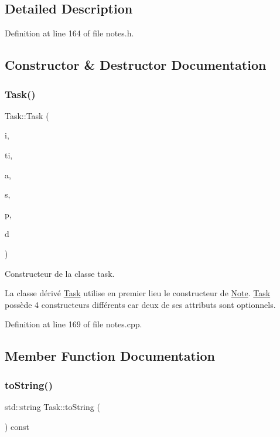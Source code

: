 \subsection{Detailed Description}


Definition at line 164 of file notes.\+h.



\subsection{Constructor \& Destructor Documentation}
\mbox{\label{class_task_a08a0f57803d8ef35f687f23f759e9f0c}} 
\subsubsection{\texorpdfstring{Task()}{Task()}}
{\footnotesize\ttfamily Task\+::\+Task (\begin{DoxyParamCaption}\item[{const Q\+String \&}]{i,  }\item[{const Q\+String \&}]{ti,  }\item[{const Q\+String \&}]{a,  }\item[{E\+N\+U\+M\+::\+Status\+Type}]{s,  }\item[{unsigned int}]{p,  }\item[{const Q\+Date\+Time}]{d }\end{DoxyParamCaption})}



Constructeur de la classe task. 

La classe dérivé \hyperlink{class_task}{Task} utilise en premier lieu le constructeur de \hyperlink{class_note}{Note}. \hyperlink{class_task}{Task} possède 4 constructeurs différents car deux de ses attributs sont optionnels. 

Definition at line 169 of file notes.\+cpp.



\subsection{Member Function Documentation}
\mbox{\label{class_task_a7fe5cb7b57a21693e7abfea2f9618563}} 
\subsubsection{\texorpdfstring{to\+String()}{toString()}}
{\footnotesize\ttfamily std\+::string Task\+::to\+String (\begin{DoxyParamCaption}{ }\end{DoxyParamCaption}) const\hspace{0.3cm}{\ttfamily [virtual]}}



